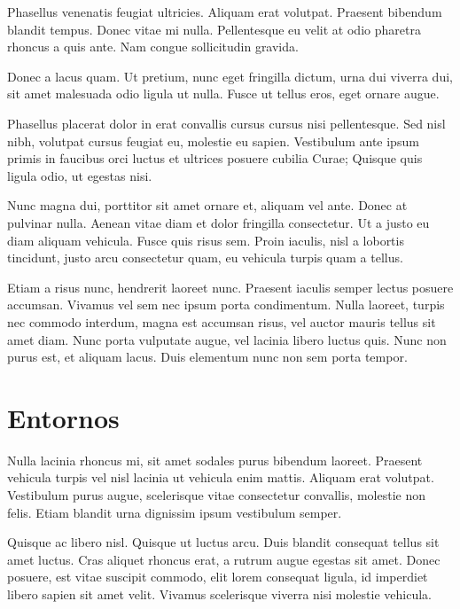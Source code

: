 \documentclass[12pt,a4paper]{report}
\begin{document}
Phasellus venenatis feugiat ultricies. Aliquam erat volutpat. Praesent bibendum blandit tempus. Donec vitae mi nulla. Pellentesque eu velit at odio pharetra rhoncus a quis ante. Nam congue sollicitudin gravida. 

Donec a lacus quam. Ut pretium, nunc eget fringilla dictum, urna dui viverra dui, sit amet malesuada odio ligula ut nulla. Fusce ut tellus eros, eget ornare augue.

Phasellus placerat dolor in erat convallis cursus cursus nisi pellentesque. Sed nisl nibh, volutpat cursus feugiat eu, molestie eu sapien. Vestibulum ante ipsum primis in faucibus orci luctus et ultrices posuere cubilia Curae; Quisque quis ligula odio, ut egestas nisi. 

Nunc magna dui, porttitor sit amet ornare et, aliquam vel ante. Donec at pulvinar nulla. Aenean vitae diam et dolor fringilla consectetur. Ut a justo eu diam aliquam vehicula. Fusce quis risus sem. Proin iaculis, nisl a lobortis tincidunt, justo arcu consectetur quam, eu vehicula turpis quam a tellus.

Etiam a risus nunc, hendrerit laoreet nunc. Praesent iaculis semper lectus posuere accumsan. Vivamus vel sem nec ipsum porta condimentum. Nulla laoreet, turpis nec commodo interdum, magna est accumsan risus, vel auctor mauris tellus sit amet diam. Nunc porta vulputate augue, vel lacinia libero luctus quis. Nunc non purus est, et aliquam lacus. Duis elementum nunc non sem porta tempor.





\section{Entornos}
\label{seccion.entornos}



Nulla lacinia rhoncus mi, sit amet sodales purus bibendum laoreet. Praesent vehicula turpis vel nisl lacinia ut vehicula enim mattis. Aliquam erat volutpat. Vestibulum purus augue, scelerisque vitae consectetur convallis, molestie non felis. Etiam blandit urna dignissim ipsum vestibulum semper.

Quisque ac libero nisl. Quisque ut luctus arcu. Duis blandit consequat tellus sit amet luctus. Cras aliquet rhoncus erat, a rutrum augue egestas sit amet. Donec posuere, est vitae suscipit commodo, elit lorem consequat ligula, id imperdiet libero sapien sit amet velit. Vivamus scelerisque viverra nisi molestie vehicula. 
\end{document}
